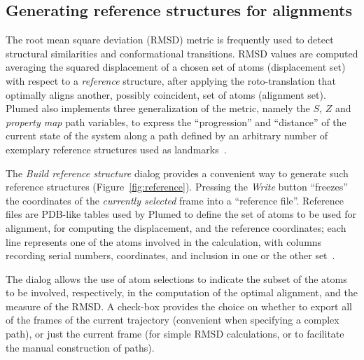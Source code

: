 \documentclass[preprint,review,11pt]{elsarticle}
\begin{document}
\subsection{Generating reference structures for alignments}


The root mean square deviation (RMSD) metric is frequently used to
detect structural similarities and conformational transitions.  RMSD
values are computed averaging the squared displacement of a chosen set
of atoms (displacement set) with respect to a \emph{reference}
structure, after applying the roto-translation that optimally aligns
another, possibly coincident, set of atoms (alignment set).  Plumed
also implements three generalization of the metric, namely the $S$,
$Z$ and \emph{property map} path variables, to express the
``progression'' and ``distance'' of the current state of the system
along a path defined by an arbitrary number of exemplary reference
structures used as
landmarks~\cite{Branduardi_Gervasio_Parrinello_2007,Spiwok_2011}.



The \emph{Build reference structure} dialog provides a convenient way
to generate such reference structures (Figure~\ref{fig:reference}).
Pressing the \emph{Write} button ``freezes'' the coordinates of the
\emph{currently selected} frame into a ``reference file''.  Reference
files are PDB-like tables used by Plumed to define the set of atoms to
be used for alignment, for computing the displacement, and the
reference coordinates; each line represents one of the atoms involved
in the calculation, with columns recording serial numbers,
coordinates, and inclusion in one or the other
set~\cite{plumed_manual}.  


The dialog allows the use of atom selections to indicate the subset of
the atoms to be involved, respectively, in the computation of the
optimal alignment, and the measure of the RMSD. A check-box provides
the choice on whether to export all of the frames of the current
trajectory (convenient when specifying a complex path), or just the
current frame (for simple RMSD calculations, or to facilitate the
manual construction of paths).
\end{document}
